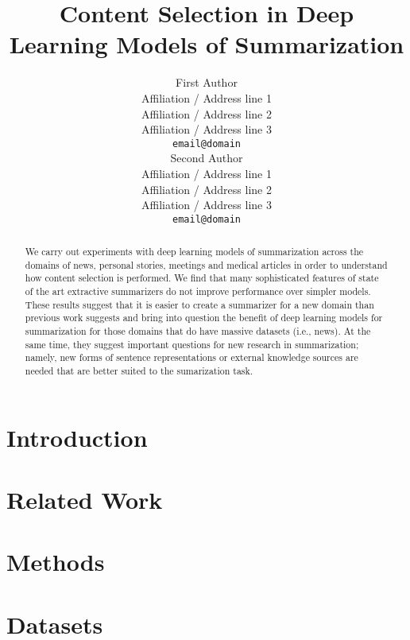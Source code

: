 \documentclass[11pt,a4paper]{article}
\title{Content Selection in Deep Learning Models of Summarization}
\author{First Author \\
  Affiliation / Address line 1 \\
  Affiliation / Address line 2 \\
  Affiliation / Address line 3 \\
  {\tt email@domain} \\\And
  Second Author \\
  Affiliation / Address line 1 \\
  Affiliation / Address line 2 \\
  Affiliation / Address line 3 \\
  {\tt email@domain} \\}
\date{}
\begin{document}
\maketitle
\begin{abstract}
We carry out experiments with deep learning models of summarization across the domains of news, personal stories, meetings and medical articles in order to understand how content selection is performed. We find that many sophisticated features of state of the art extractive summarizers do not improve performance over simpler models. These results suggest that it is easier to create a summarizer for  a new domain than previous work suggests and bring into question the benefit of deep learning models for summarization for those domains that do have massive datasets (i.e., news). At the same time, they suggest important questions for new research in summarization; namely,  new forms of sentence representations or external knowledge sources are needed that are better suited to the sumarization task. 
\end{abstract}



\section{Introduction}


\section{Related Work} \label{sec:related}


\section{Methods}


%



\section{Datasets}
\label{sec:datasets}




\end{document}
